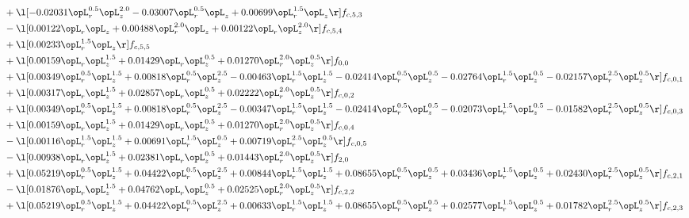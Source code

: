 \begin{alignat}{2}
& + \l[  -0.02031 \opL_r^{0.5} \opL_z^{2.0}   -0.03007 \opL_r^{0.5} \opL_z +  0.00699 \opL_r^{1.5} \opL_z  \r] f_{c,5,3} \nonumber \\ 
& - \l[  0.00122 \opL_r \opL_z +  0.00488 \opL_r^{2.0} \opL_z +  0.00122 \opL_r \opL_z^{2.0}  \r] f_{c,5,4} \nonumber \\ 
& + \l[  0.00233 \opL_r^{1.5} \opL_z  \r] f_{c,5,5} \nonumber \\ 
& + \l[  0.00159 \opL_r \opL_z^{1.5} +  0.01429 \opL_r \opL_z^{0.5} +  0.01270 \opL_r^{2.0} \opL_z^{0.5}  \r] f_{0,0} \nonumber \\ 
& + \l[  0.00349 \opL_r^{0.5} \opL_z^{1.5} +  0.00818 \opL_r^{0.5} \opL_z^{2.5}   -0.00463 \opL_r^{1.5} \opL_z^{1.5}   -0.02414 \opL_r^{0.5} \opL_z^{0.5}   -0.02764 \opL_r^{1.5} \opL_z^{0.5}   -0.02157 \opL_r^{2.5} \opL_z^{0.5}  \r] f_{c,0,1} \nonumber \\ 
& + \l[  0.00317 \opL_r \opL_z^{1.5} +  0.02857 \opL_r \opL_z^{0.5} +  0.02222 \opL_r^{2.0} \opL_z^{0.5}  \r] f_{c,0,2} \nonumber \\ 
& + \l[  0.00349 \opL_r^{0.5} \opL_z^{1.5} +  0.00818 \opL_r^{0.5} \opL_z^{2.5}   -0.00347 \opL_r^{1.5} \opL_z^{1.5}   -0.02414 \opL_r^{0.5} \opL_z^{0.5}   -0.02073 \opL_r^{1.5} \opL_z^{0.5}   -0.01582 \opL_r^{2.5} \opL_z^{0.5}  \r] f_{c,0,3} \nonumber \\ 
& + \l[  0.00159 \opL_r \opL_z^{1.5} +  0.01429 \opL_r \opL_z^{0.5} +  0.01270 \opL_r^{2.0} \opL_z^{0.5}  \r] f_{c,0,4} \nonumber \\ 
& - \l[  0.00116 \opL_r^{1.5} \opL_z^{1.5} +  0.00691 \opL_r^{1.5} \opL_z^{0.5} +  0.00719 \opL_r^{2.5} \opL_z^{0.5}  \r] f_{c,0,5} \nonumber \\ 
& - \l[  0.00938 \opL_r \opL_z^{1.5} +  0.02381 \opL_r \opL_z^{0.5} +  0.01443 \opL_r^{2.0} \opL_z^{0.5}  \r] f_{2,0} \nonumber \\ 
& + \l[  0.05219 \opL_r^{0.5} \opL_z^{1.5} +  0.04422 \opL_r^{0.5} \opL_z^{2.5} +  0.00844 \opL_r^{1.5} \opL_z^{1.5} +  0.08655 \opL_r^{0.5} \opL_z^{0.5} +  0.03436 \opL_r^{1.5} \opL_z^{0.5} +  0.02430 \opL_r^{2.5} \opL_z^{0.5}  \r] f_{c,2,1} \nonumber \\ 
& - \l[  0.01876 \opL_r \opL_z^{1.5} +  0.04762 \opL_r \opL_z^{0.5} +  0.02525 \opL_r^{2.0} \opL_z^{0.5}  \r] f_{c,2,2} \nonumber \\ 
& + \l[  0.05219 \opL_r^{0.5} \opL_z^{1.5} +  0.04422 \opL_r^{0.5} \opL_z^{2.5} +  0.00633 \opL_r^{1.5} \opL_z^{1.5} +  0.08655 \opL_r^{0.5} \opL_z^{0.5} +  0.02577 \opL_r^{1.5} \opL_z^{0.5} +  0.01782 \opL_r^{2.5} \opL_z^{0.5}  \r] f_{c,2,3} \nonumber \\ 

\end{alignat}

